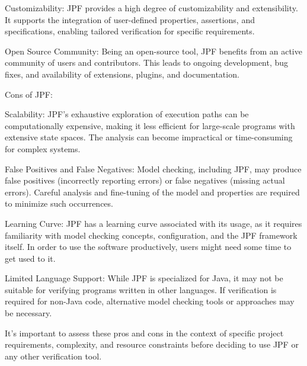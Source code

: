 Customizability: JPF provides a high degree of customizability and extensibility. It supports the integration of user-defined properties, assertions, and specifications, enabling tailored verification for specific requirements.

Open Source Community: Being an open-source tool, JPF benefits from an active community of users and contributors. This leads to ongoing development, bug fixes, and availability of extensions, plugins, and documentation.

Cons of JPF:

Scalability: JPF's exhaustive exploration of execution paths can be computationally expensive, making it less efficient for large-scale programs with extensive state spaces. The analysis can become impractical or time-consuming for complex systems.

False Positives and False Negatives: Model checking, including JPF, may produce false positives (incorrectly reporting errors) or false negatives (missing actual errors). Careful analysis and fine-tuning of the model and properties are required to minimize such occurrences.

Learning Curve: JPF has a learning curve associated with its usage, as it requires familiarity with model checking concepts, configuration, and the JPF framework itself. In order to use the software productively, users might need some time to get used to it. 

Limited Language Support: While JPF is specialized for Java, it may not be suitable for verifying programs written in other languages. If verification is required for non-Java code, alternative model checking tools or approaches may be necessary.

It's important to assess these pros and cons in the context of specific project requirements, complexity, and resource constraints before deciding to use JPF or any other verification tool.